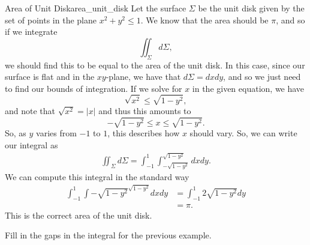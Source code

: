                                       \begin{ex}{Area of Unit Disk}{area_unit_disk}
                                      	Let the surface $\Sigma$ be the unit disk given by the set of points in the plane $x^2+y^2\leq 1$.  We know that the area should be $\pi$, and so if we integrate
                                      	\[
                                      	\iint_\Sigma d\Sigma,
                                      	\]
                                      	we should find this to be equal to the area of the unit disk.  In this case, since our surface is flat and in the $xy$-plane, we have that $d\Sigma = dxdy$, and so we just need to find our bounds of integration.  If we solve for $x$ in the given equation, we have
                                      	\[
                                      	\sqrt{x^2} \leq \sqrt{1-y^2},
                                      	\]
                                      	and note that $\sqrt{x^2}=|x|$ and thus this amounts to
                                      	\[
                                      	-\sqrt{1-y^2}\leq x \leq \sqrt{1-y^2}.
                                      	\]
                                      	So, as $y$ varies from $-1$ to $1$, this describes how $x$ should vary. So, we can write our integral as
                                      	\begin{align*}
                                      	\iint_\Sigma d\Sigma = \int_{-1}^1 \int_{-\sqrt{1-y^2}}^{\sqrt{1-y^2}} dxdy.
                                      	\end{align*}
                                      	We can compute this integral in the standard way
                                      	\begin{align*}
                                      	\int_{-1}^1 \int{-\sqrt{1-y^2}}^{\sqrt{1-y^2}} dxdy &= \int_{-1}^1 2\sqrt{1-y^2}dy\\
                                      	&= \pi.
                                      	\end{align*}
                                      	This is the correct area of the unit disk.
                                      \end{ex}

                                      \begin{exercise}
                                      Fill in the gaps in the integral for the previous example.
                                      \end{exercise}

